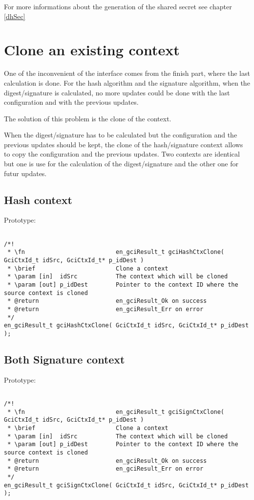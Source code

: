 For more informations about the generation of the shared secret see
chapter \ref{dhSec}

\newpage


\section{Clone an existing context}

One of the inconvenient of the interface comes from the finish part, where the
last calculation is done.
For the hash algorithm and the signature algorithm, when the digest/signature is
calculated, no more updates could be done with the last configuration and
with the previous updates.

The solution of this problem is the clone of the context.

When the digest/signature has to be calculated but the configuration and the
previous updates should be kept, the clone of the hash/signature context allows
to copy the configuration and the previous updates. Two contexts are identical
but one is use for the calculation of the digest/signature and the other one for
futur updates.

\subsection{Hash context}
Prototype:
\begin{lstlisting}

/*!
 * \fn 							en_gciResult_t gciHashCtxClone( GciCtxId_t idSrc, GciCtxId_t* p_idDest )
 * \brief						Clone a context
 * \param [in]  idSrc			The context which will be cloned
 * \param [out] p_idDest		Pointer to the context ID where the source context is cloned
 * @return						en_gciResult_Ok on success
 * @return						en_gciResult_Err on error
 */
en_gciResult_t gciHashCtxClone( GciCtxId_t idSrc, GciCtxId_t* p_idDest );

\end{lstlisting}

\subsection{Both Signature context}
Prototype:
\begin{lstlisting}

/*!
 * \fn 							en_gciResult_t gciSignCtxClone( GciCtxId_t idSrc, GciCtxId_t* p_idDest )
 * \brief						Clone a context
 * \param [in]  idSrc			The context which will be cloned
 * \param [out] p_idDest		Pointer to the context ID where the source context is cloned
 * @return						en_gciResult_Ok on success
 * @return						en_gciResult_Err on error
 */
en_gciResult_t gciSignCtxClone( GciCtxId_t idSrc, GciCtxId_t* p_idDest );

\end{lstlisting}

